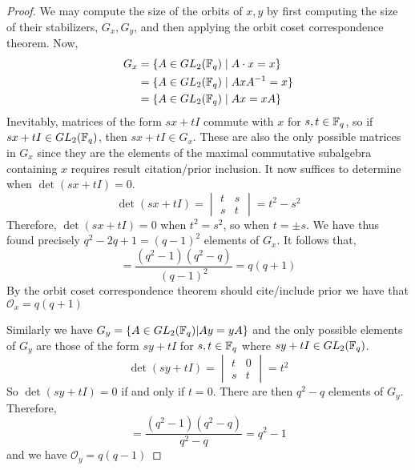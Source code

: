 \documentclass{amsart}
\begin{document}
\begin{proof}
    We may compute the size of the orbits of $x, y$ by first computing the size of their stabilizers, $G_x, G_y$, and then applying the orbit coset correspondence theorem.
    Now,
    \begin{align*}
        G_x &= \{A \in GL_2(\protect\mathbb{F}_q) \mid A \cdot x = x\} \\
            &= \{A \in GL_2(\protect\mathbb{F}_q) \mid AxA^{-1} = x\} \\
            &= \{A \in GL_2(\protect\mathbb{F}_q) \mid Ax = xA\} 
    \end{align*}
    Inevitably, matrices of the form $sx + tI$ commute with $x$ for $s,t \in \protect\mathbb{F}_q$, so if $sx + tI \in GL_2(\protect\mathbb{F}_q)$, then $sx + tI \in G_x$. These are also the only possible matrices in $G_x$ since they are the elements of the maximal commutative subalgebra containing $x$ {\color{blue} requires result citation/prior inclusion}. It now suffices to determine when $\det(sx + tI) = 0$.
    \begin{equation*}
        \det(sx+tI) =
        \begin{vmatrix}
            t & s \\
            s & t
        \end{vmatrix} = t^2 - s^2
    \end{equation*}
    Therefore, $\det(sx + tI) = 0$ when $t^2 = s^2$, so when $t = \pm s$. We have thus found precisely $q^2 - 2q + 1 = (q-1)^2$ elements of $G_x$. It follows that,
    \begin{equation*}
        [GL_2(\bF_q) : G_x] = \frac{(q^2-1)(q^2-q)}{(q-1)^2} = q(q + 1)
    \end{equation*}
    By the orbit coset correspondence theorem {\color{blue} should cite/include prior} we have that $\mathcal{O}_x = q(q + 1)$

    Similarly we have $G_y = \{A \in GL_2(\protect\mathbb{F}_q) | Ay = yA\}$ and the only possible elements of $G_y$ are those of the form $sy + tI$ for $s,t \in \protect\mathbb{F}_q$ where $sy+tI \in GL_2(\protect\mathbb{F}_q)$.
    \begin{equation*}
        \det(sy+tI) =
        \begin{vmatrix}
            t & 0 \\
            s & t
        \end{vmatrix} = t^2
    \end{equation*}
    So $\det(sy + tI) = 0$ if and only if $t = 0$. There are then $q^2 - q$ elements of $G_y$. Therefore,
    \begin{equation*}
        [GL_2(\bF_q) : G_y] = \frac{(q^2-1)(q^2-q)}{q^2 - q} = q^2 - 1
    \end{equation*}
    and we have $\mathcal{O}_y = q(q - 1)$
\end{proof}
\end{document}
